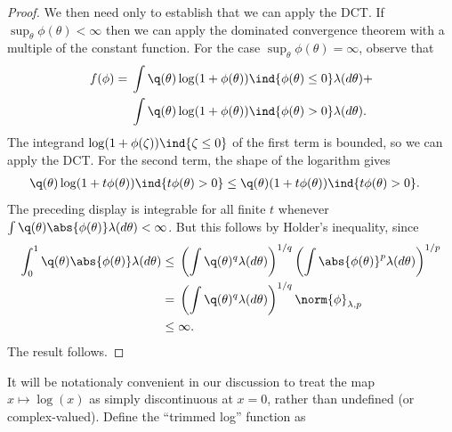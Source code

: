 \begin{lem}
\begin{proof}
We then need only to establish that we can apply the DCT. If $\sup_\theta
\phi(\theta) < \infty$ then we can apply the dominated convergence theorem with
a multiple of the constant function.  For the case $\sup_\theta \phi(\theta) =
\infty$, observe that
%
\begin{align*}
%
f(\phi) ={}&
    \int \q(\theta) \log(1 + \phi(\theta)) \ind{\phi(\theta) \le 0}
        \lambda(d\theta) + \\
    &\int \q(\theta) \log(1 + \phi(\theta)) \ind{\phi(\theta) > 0}
        \lambda(d\theta).
%
\end{align*}
%
The integrand $\log(1 + \phi(\zeta)) \ind{\zeta \le 0}$ of the first term
is bounded, so we can apply the DCT.  For the second term, the shape of
the logarithm gives
%
\begin{align*}
%
\q(\theta) \log(1 + t \phi(\theta)) \ind{t \phi(\theta) > 0}   \le{}&
    \q(\theta) (1 + t \phi(\theta)) \ind{t \phi(\theta) > 0}.%
\end{align*}
%
The preceding display is integrable for all finite $t$ whenever $\int \q(\theta)
\abs{\phi(\theta)} \lambda(d\theta) < \infty$. But this follows by Holder's
inequality, since
%
\begin{align*}
%
\int_0^1 \q(\theta) \abs{\phi(\theta)} \lambda(d \theta) \le{}&
    \left( \int \q(\theta)^q \lambda(d \theta) \right)^{1/q}
    \left( \int \abs{\phi(\theta)}^p \lambda(d \theta) \right)^{1/p}
\\={}&
    \left( \int \q(\theta)^q \lambda(d \theta) \right)^{1/q}
    \norm{\phi}_{\lambda,p}
\\\le{}&
    \infty.
%
\end{align*}
%
The result follows.
%
\end{proof}
%
\end{lem}





























It will be notationaly convenient in our discussion to treat the map $x \mapsto
\log(x)$ as simply discontinuous at $x = 0$, rather than undefined (or
complex-valued). Define the ``trimmed log'' function as

